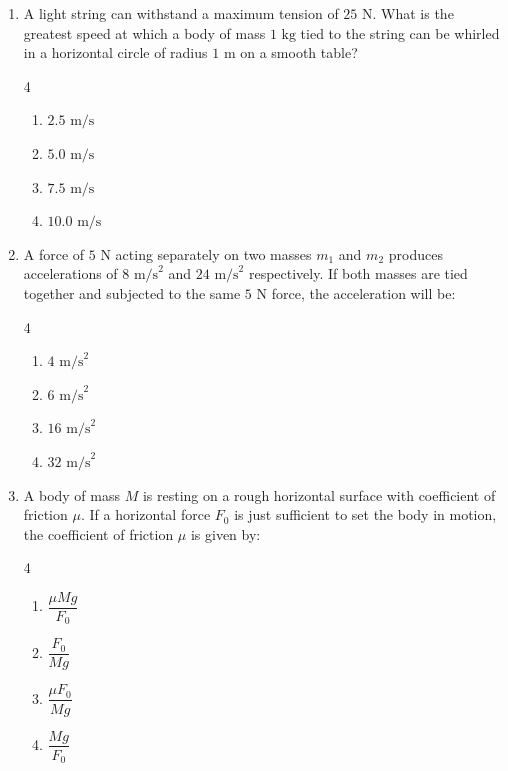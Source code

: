 \documentclass[11pt,a4paper]{article}
\begin{document}
\begin{enumerate}[label=\textbf{\arabic*.},leftmargin=18pt,itemsep=8pt]
  \item A light string can withstand a maximum tension of $25\text{ N}$. What is the greatest speed at which a body of mass $1\text{ kg}$ tied to the string can be whirled in a horizontal circle of radius $1\text{ m}$ on a smooth table?
  \begin{multicols}{4}
    \begin{enumerate}[label=(\Alph*)]
      \item $2.5\text{ m/s}$
      \item $5.0\text{ m/s}$
      \item $7.5\text{ m/s}$
      \item $10.0\text{ m/s}$
    \end{enumerate}
  \end{multicols}

  \item A force of $5\text{ N}$ acting separately on two masses $m_1$ and $m_2$ produces accelerations of $8\text{ m/s}^2$ and $24\text{ m/s}^2$ respectively. If both masses are tied together and subjected to the same $5\text{ N}$ force, the acceleration will be:
  \begin{multicols}{4}
    \begin{enumerate}[label=(\Alph*)]
      \item $4\text{ m/s}^2$
      \item $6\text{ m/s}^2$
      \item $16\text{ m/s}^2$
      \item $32\text{ m/s}^2$
    \end{enumerate}
  \end{multicols}

  \item A body of mass $M$ is resting on a rough horizontal surface with coefficient of friction $\mu$. If a horizontal force $F_0$ is just sufficient to set the body in motion, the coefficient of friction $\mu$ is given by:
  \begin{multicols}{4}
    \begin{enumerate}[label=(\Alph*)]
      \item $\dfrac{\mu Mg}{F_0}$
      \item $\dfrac{F_0}{Mg}$
      \item $\dfrac{\mu F_0}{Mg}$
      \item $\dfrac{Mg}{F_0}$
    \end{enumerate}
  \end{multicols}

\end{enumerate}
\newpage
\end{document}
